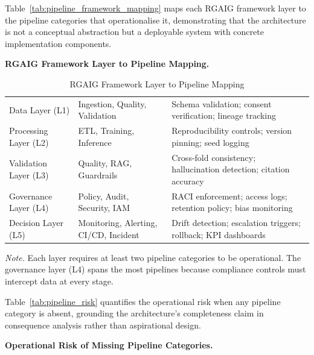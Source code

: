 Table~\ref{tab:pipeline_framework_mapping} maps each RGAIG framework layer to the pipeline categories that operationalise it, demonstrating that the architecture is not a conceptual abstraction but a deployable system with concrete implementation components.


\noindent\textbf{RGAIG Framework Layer to Pipeline Mapping.}

\begin{table}[H]
\tablestripes
\tablefontsize
\caption{RGAIG Framework Layer to Pipeline Mapping}
\begin{tabularx}{\textwidth}{@{} >{\raggedright\arraybackslash}p{2.5cm} L L @{}}
\toprule
{} &  &  \\
\midrule
Data Layer (L1) & Ingestion, Quality, Validation & Schema validation; consent verification; lineage tracking \\
\addlinespace
Processing Layer (L2) & ETL, Training, Inference & Reproducibility controls; version pinning; seed logging \\
\addlinespace
Validation Layer (L3) & Quality, RAG, Guardrails & Cross-fold consistency; hallucination detection; citation accuracy \\
\addlinespace
Governance Layer (L4) & Policy, Audit, Security, IAM & RACI enforcement; access logs; retention policy; bias monitoring \\
\addlinespace
Decision Layer (L5) & Monitoring, Alerting, CI/CD, Incident & Drift detection; escalation triggers; rollback; KPI dashboards \\
\bottomrule
\end{tabularx}
\vspace{0.5em}
\noindent\textit{Note.} Each layer requires at least two pipeline categories to be operational. The governance layer (L4) spans the most pipelines because compliance controls must intercept data at every stage.
\end{table}

Table~\ref{tab:pipeline_risk} quantifies the operational risk when any pipeline category is absent, grounding the architecture's completeness claim in consequence analysis rather than aspirational design.


\noindent\textbf{Operational Risk of Missing Pipeline Categories.}

